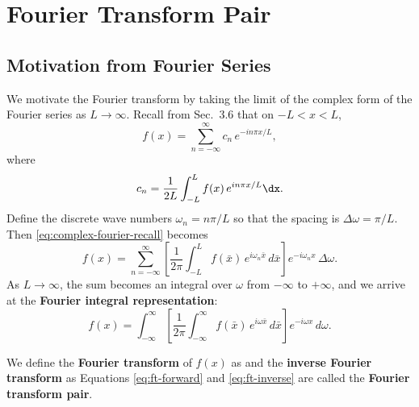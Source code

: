 \section{Fourier Transform Pair}
\label{sec:ft-pair}

\subsection{Motivation from Fourier Series}
\label{subsec:ft-motivation}

We motivate the Fourier transform by taking the limit of the complex form of the Fourier series as $L \to \infty$.  Recall from Sec.~3.6 that on $-L < x < L$,
\begin{equation}
\label{eq:complex-fourier-recall}
f(x) = \sum_{n=-\infty}^{\infty} c_n\,e^{-in\pi x/L},
\end{equation}
where
\begin{equation}
\label{eq:complex-coeff-recall}
c_n = \frac{1}{2L}\int_{-L}^{L} f(x)\,e^{in\pi x/L}\dx.
\end{equation}
Define the discrete wave numbers $\omega_n = n\pi/L$ so that the spacing is $\Delta\omega = \pi/L$.  Then \eqref{eq:complex-fourier-recall} becomes
\[
f(x) = \sum_{n=-\infty}^{\infty} \left[\frac{1}{2\pi}\int_{-L}^{L} f(\bar{x})\,e^{i\omega_n \bar{x}}\,d\bar{x}\right] e^{-i\omega_n x}\,\Delta\omega.
\]
As $L \to \infty$, the sum becomes an integral over $\omega$ from $-\infty$ to $+\infty$, and we arrive at the \textbf{Fourier integral representation}:
\begin{equation}
\label{eq:fourier-integral-rep}
f(x) = \int_{-\infty}^{\infty}\left[\frac{1}{2\pi}\int_{-\infty}^{\infty} f(\bar{x})\,e^{i\omega\bar{x}}\,d\bar{x}\right]e^{-i\omega x}\,d\omega.
\end{equation}

We define the \textbf{Fourier transform} of $f(x)$ as
and the \textbf{inverse Fourier transform} as
Equations \eqref{eq:ft-forward} and \eqref{eq:ft-inverse} are called the \textbf{Fourier transform pair}.

